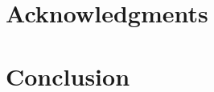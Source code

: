 \documentclass{InsightArticle}
\begin{document}
\section{Acknowledgments}



\section{Conclusion}










\appendix





\nocite{ITKSoftwareGuide}
\end{document}
